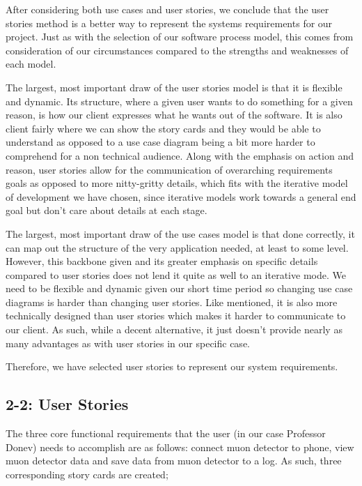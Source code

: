 \documentclass[11pt,a4paper]{article}
\begin{document}
After considering both use cases and user stories, we conclude that the user stories method is a better way to represent the systems requirements for our project. Just as with the selection of our software process model, this comes from consideration of our circumstances compared to the strengths and weaknesses of each model.

The largest, most important draw of the user stories model is that it is flexible and dynamic. Its structure, where a given user wants to do something for a given reason, is how our client expresses what he wants out of the software. It is also client fairly where we can show the story cards and they would be able to understand as opposed to a use case diagram being a bit more harder to comprehend for a non technical audience. Along with the emphasis on action and reason, user stories allow for the communication of overarching requirements goals as opposed to more nitty-gritty details, which fits with the iterative model of development we have chosen, since iterative models work towards a general end goal but don’t care about details at each stage.

The largest, most important draw of the use cases model is that done correctly, it can map out the structure of the very application needed, at least to some level. However, this backbone given and its greater emphasis on specific details compared to user stories does not lend it quite as well to an iterative mode. We need to be flexible and dynamic given our short time period so changing use case diagrams is harder than changing user stories. Like mentioned, it is also more technically designed than user stories which makes it harder to communicate to our client. As such, while a decent alternative, it just doesn’t provide nearly as many advantages as with user stories in our specific case.

Therefore, we have selected user stories to represent our system requirements.


\subsection*{2-2: User Stories}

The three core functional requirements that the user (in our case Professor Donev) needs to accomplish are as follows: connect muon detector to phone, view muon detector data and save data from muon detector to a log. As such, three corresponding story cards are created; 

\newpage
\end{document}
